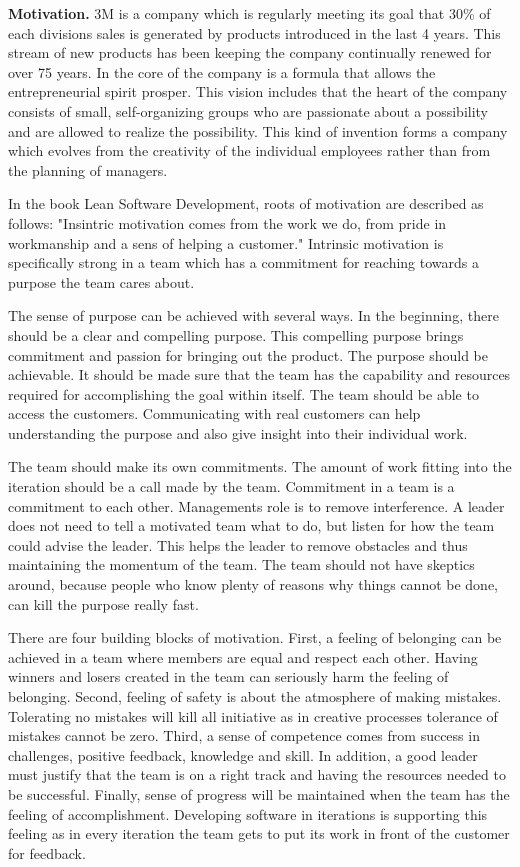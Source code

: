 
\textbf{Motivation.} 3M is a company which is regularly meeting its goal that 30\% of each divisions sales is generated by products introduced in the last 4 years. This stream of new products has been keeping the company continually renewed for over 75 years. In the core of the company is a formula that allows the entrepreneurial spirit prosper. This vision includes that the heart of the company consists of small, self-organizing groups who are passionate about a possibility and are allowed to realize the possibility. This kind of invention forms a company which evolves from the creativity of the individual employees rather than from the planning of managers.~\cite{poppendieck2003LSD}

In the book Lean Software Development, roots of motivation are described as follows: "Insintric motivation comes from the work we do, from pride in workmanship and a sens of helping a customer." Intrinsic motivation is specifically strong in a team which has a commitment for reaching towards a purpose the team cares about.~\cite{poppendieck2003LSD}

The sense of purpose can be achieved with several ways. In the beginning, there should be a clear and compelling purpose. This compelling purpose brings commitment and passion for bringing out the product. The purpose should be achievable. It should be made sure that the team has the capability and resources required for accomplishing the goal within itself. The team should be able to access the customers. Communicating with real customers can help understanding the purpose and also give insight into their individual work.~\cite{poppendieck2003LSD}

The team should make its own commitments. The amount of work fitting into the iteration should be a call made by the team. Commitment in a team is a commitment to each other. Managements role is to remove interference. A leader does not need to tell a motivated team what to do, but listen for how the team could advise the leader. This helps the leader to remove obstacles and thus maintaining the momentum of the team. The team should not have skeptics around, because people who know plenty of reasons why things cannot be done, can kill the purpose really fast.~\cite{poppendieck2003LSD}

There are four building blocks of motivation. First, a feeling of belonging can be achieved in a team where members are equal and respect each other. Having winners and losers created in the team can seriously harm the feeling of belonging. Second, feeling of safety is about the atmosphere of making mistakes. Tolerating no mistakes will kill all initiative as in creative processes tolerance of mistakes cannot be zero. Third, a sense of competence comes from success in challenges, positive feedback, knowledge and skill. In addition, a good leader must justify that the team is on a right track and having the resources needed to be successful. Finally, sense of progress will be maintained when the team has the feeling of accomplishment. Developing software in iterations is supporting this feeling as in every iteration the team gets to put its work in front of the customer for feedback.~\cite{poppendieck2003LSD}

